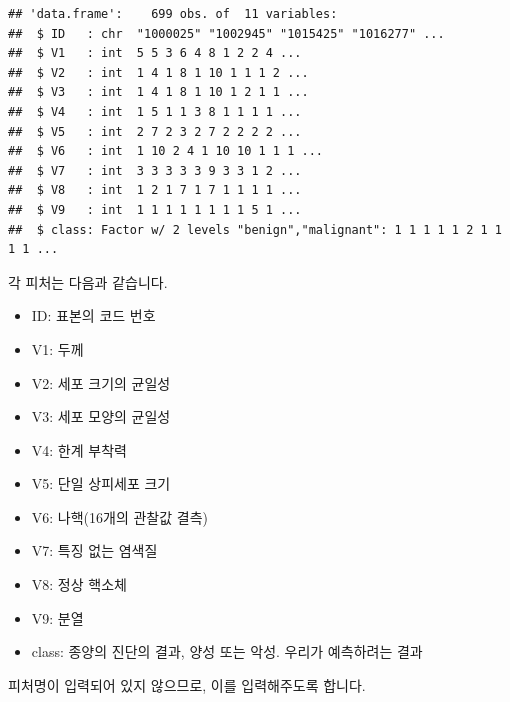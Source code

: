 \documentclass[12pt,]{book}
\newenvironment{Shaded}{\begin{snugshade}}{\end{snugshade}}
\newcommand{\KeywordTok}[1]{\textcolor[rgb]{0.13,0.29,0.53}{\textbf{#1}}}
\newcommand{\NormalTok}[1]{#1}
\newcommand{\OperatorTok}[1]{\textcolor[rgb]{0.81,0.36,0.00}{\textbf{#1}}}
\newcommand{\OtherTok}[1]{\textcolor[rgb]{0.56,0.35,0.01}{#1}}
\newcommand{\StringTok}[1]{\textcolor[rgb]{0.31,0.60,0.02}{#1}}
\providecommand{\tightlist}{%
  \setlength{\itemsep}{0pt}\setlength{\parskip}{0pt}}
\begin{document}
\begin{verbatim}
## 'data.frame':    699 obs. of  11 variables:
##  $ ID   : chr  "1000025" "1002945" "1015425" "1016277" ...
##  $ V1   : int  5 5 3 6 4 8 1 2 2 4 ...
##  $ V2   : int  1 4 1 8 1 10 1 1 1 2 ...
##  $ V3   : int  1 4 1 8 1 10 1 2 1 1 ...
##  $ V4   : int  1 5 1 1 3 8 1 1 1 1 ...
##  $ V5   : int  2 7 2 3 2 7 2 2 2 2 ...
##  $ V6   : int  1 10 2 4 1 10 10 1 1 1 ...
##  $ V7   : int  3 3 3 3 3 9 3 3 1 2 ...
##  $ V8   : int  1 2 1 7 1 7 1 1 1 1 ...
##  $ V9   : int  1 1 1 1 1 1 1 1 5 1 ...
##  $ class: Factor w/ 2 levels "benign","malignant": 1 1 1 1 1 2 1 1 1 1 ...
\end{verbatim}

각 피처는 다음과 같습니다.

\begin{itemize}
\tightlist
\item
  ID: 표본의 코드 번호
\item
  V1: 두께
\item
  V2: 세포 크기의 균일성
\item
  V3: 세포 모양의 균일성
\item
  V4: 한계 부착력
\item
  V5: 단일 상피세포 크기
\item
  V6: 나핵(16개의 관찰값 결측)
\item
  V7: 특징 없는 염색질
\item
  V8: 정상 핵소체
\item
  V9: 분열
\item
  class: 종양의 진단의 결과, 양성 또는 악성. 우리가 예측하려는 결과
\end{itemize}

피처명이 입력되어 있지 않으므로, 이를 입력해주도록 합니다.

\begin{Shaded}
\end{Shaded}
\end{document}
